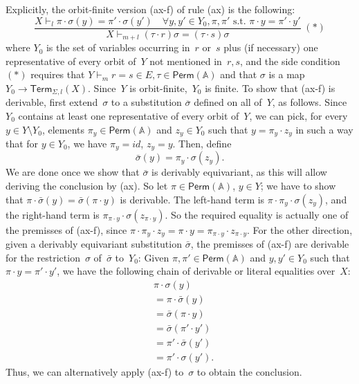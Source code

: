 \documentclass[a4paper,UKenglish,cleveref,thm-restate,numberwithinsect,final]{lipics-v2021}
\newcommand{\Perm}{\mathsf{Perm}(\Names)}
\newcommand{\Term}{\mathsf{Term}}
\newcommand{\Names}{\mathbb{A}}
\theoremstyle{plain}
\newcommand{\id}{\mathit{id}}
\numberwithin{equation}{section}
\newcommand{\+}[1]{\mathcal{#1}\xspace}
\theoremstyle{definition}
\begin{document}
Explicitly, the orbit-finite version (ax-f) of rule (ax) is the following:
\begin{equation*}
  \frac{X \vdash_l \pi\cdot \sigma(y) = \pi'\cdot\sigma(y') \quad
    \forall y,y' \in Y_0, \pi,\pi' \text{ s.t.~$\pi\cdot y=\pi'\cdot y'$}}{X \vdash_{m + l} (\tau\cdot r)\sigma =
      (\tau\cdot s)\sigma} \;(*)
\end{equation*}
where $Y_0$ is the set of variables occurring in~$r$ or~$s$ plus (if
necessary) one representative of every orbit of~$Y$ not mentioned
in~$r,s$, and the side condition~$(*)$ requires that
$Y \vdash_m r = s \in E, \tau \in \Perm$ and that $\sigma$ is a map
$Y_0\to\Term_{\Sigma,l}(X)$. Since~$Y$ is orbit-finite,~$Y_0$ is
finite. To show that (ax-f) is derivable, first extend~$\sigma$ to a
substitution $\overline\sigma$ defined on all of~$Y$, as follows.
Since~$Y_0$ contains at least one representative of every orbit
of~$Y$, we can pick, for every~$y\in Y\setminus Y_0$, elements
$\pi_y\in \Perm$ and $z_y\in Y_0$ such that $y=\pi_y\cdot z_y$ in such a
way that for $y\in Y_0$, we have $\pi_y=\id$, $z_y=y$. Then, define
\begin{equation*}
  \bar\sigma(y)=\pi_y\cdot\sigma(z_y).
\end{equation*}
We are done once we show that $\bar\sigma$ is derivably equivariant,
as this will allow deriving the conclusion by (ax). So let $\pi\in \Perm$,
$y\in Y$; we have to show that
$\pi\cdot\bar\sigma(y)=\bar\sigma(\pi\cdot y)$ is derivable. The
left-hand term is $\pi\cdot\pi_y\cdot\sigma( z_y)$, and the right-hand
term is $\pi_{\pi\cdot y}\cdot\sigma(z_{\pi\cdot y})$. So the required
equality is actually one of the premisses of (ax-f), since
$\pi\cdot\pi_y\cdot z_y=\pi\cdot y=\pi_{\pi\cdot y}\cdot z_{\pi\cdot
  y}$. For the other direction, given a derivably equivariant substitution
$\bar\sigma$, the premisses of (ax-f) are derivable for the
restriction~$\sigma$ of~$\bar\sigma$ to~$Y_0$: Given $\pi,\pi'\in \Perm$
and $y,y'\in Y_0$ such that $\pi\cdot y=\pi'\cdot y'$, we have the
following chain of derivable or literal equalities
over~$X$:
\begin{align*}
  & \pi\cdot\sigma(y) \\
  & = \pi\cdot\bar\sigma(y) \\
  & = \bar\sigma(\pi\cdot y) \\
  & = \bar\sigma(\pi'\cdot y') \\
  & = \pi'\cdot\bar\sigma(y') \\
  & = \pi'\cdot\sigma(y').
\end{align*}
Thus, we can alternatively apply (ax-f) to~$\sigma$ to obtain the
conclusion.
\end{document}
